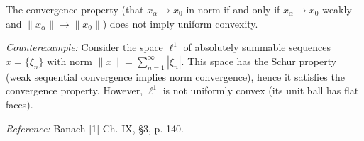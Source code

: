 The convergence property (that $x_\alpha \to x_0$ in norm if and only if $x_\alpha \to x_0$ weakly and $\|x_\alpha\| \to \|x_0\|$) does not imply uniform convexity.

\textit{Counterexample:} Consider the space $\ell^1$ of absolutely summable sequences $x = \{\xi_n\}$ with norm $\|x\| = \sum_{n=1}^\infty |\xi_n|$. This space has the Schur property (weak sequential convergence implies norm convergence), hence it satisfies the convergence property. However, $\ell^1$ is not uniformly convex (its unit ball has flat faces).

\textit{Reference:} Banach [1] Ch. IX, §3, p. 140.
